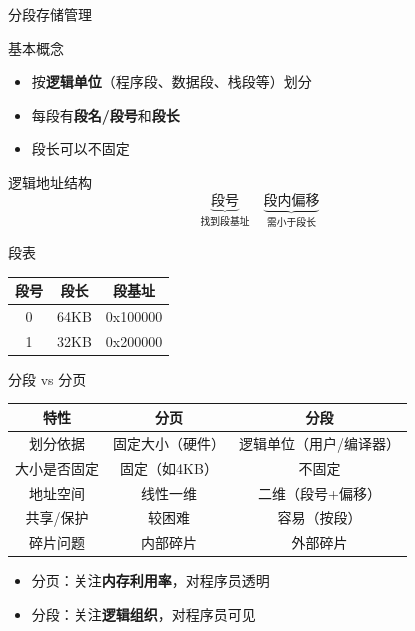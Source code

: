 \documentclass[10pt, aspectratio=169]{beamer}
\begin{document}
\begin{frame}[t]{分段存储管理}
    \begin{block}{基本概念}
        \begin{itemize}
            \item 按\textbf{逻辑单位}（程序段、数据段、栈段等）划分
            \item 每段有\textbf{段名/段号}和\textbf{段长}
            \item 段长可以不固定
        \end{itemize}
    \end{block}
    \vspace{0.3em}
    \begin{block}{逻辑地址结构}
        \[
            \underbrace{\text{段号}}_{\text{找到段基址}} \quad
            \underbrace{\text{段内偏移}}_{\text{需小于段长}}
        \]
    \end{block}
    \vspace{0.3em}
    \begin{block}{段表}
        \begin{center}
            \begin{tabular}{|c|c|c|}
                \hline
                \textbf{段号} & \textbf{段长} & \textbf{段基址} \\
                \hline
                0 & 64KB & 0x100000 \\
                \hline
                1 & 32KB & 0x200000 \\
                \hline
            \end{tabular}
        \end{center}
    \end{block}
\end{frame}

\begin{frame}[t]{分段 vs 分页}
    \begin{center}
        \begin{tabular}{|c|c|c|}
            \hline
            \textbf{特性} & \textbf{分页} & \textbf{分段} \\
            \hline
            划分依据 & 固定大小（硬件） & 逻辑单位（用户/编译器） \\
            \hline
            大小是否固定 & 固定（如4KB） & 不固定 \\
            \hline
            地址空间 & 线性一维 & 二维（段号+偏移） \\
            \hline
            共享/保护 & 较困难 & 容易（按段） \\
            \hline
            碎片问题 & 内部碎片 & 外部碎片 \\
            \hline
        \end{tabular}
    \end{center}
    \vspace{0.5em}
    \begin{itemize}
        \item 分页：关注\textbf{内存利用率}，对程序员透明
        \item 分段：关注\textbf{逻辑组织}，对程序员可见
    \end{itemize}
\end{frame}
\end{document}
